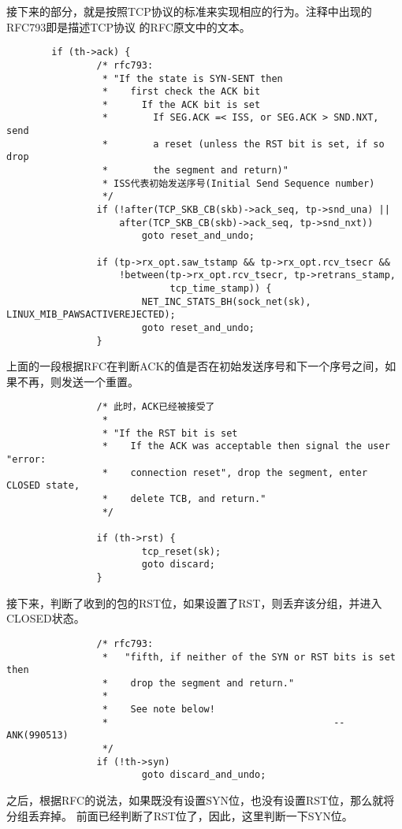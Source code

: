接下来的部分，就是按照TCP协议的标准来实现相应的行为。注释中出现的RFC793即是描述TCP协议
的RFC原文中的文本。
\begin{verbatim}
        if (th->ack) {
                /* rfc793:
                 * "If the state is SYN-SENT then
                 *    first check the ACK bit
                 *      If the ACK bit is set
                 *        If SEG.ACK =< ISS, or SEG.ACK > SND.NXT, send
                 *        a reset (unless the RST bit is set, if so drop
                 *        the segment and return)"
                 * ISS代表初始发送序号(Initial Send Sequence number)
                 */
                if (!after(TCP_SKB_CB(skb)->ack_seq, tp->snd_una) ||
                    after(TCP_SKB_CB(skb)->ack_seq, tp->snd_nxt))
                        goto reset_and_undo;

                if (tp->rx_opt.saw_tstamp && tp->rx_opt.rcv_tsecr &&
                    !between(tp->rx_opt.rcv_tsecr, tp->retrans_stamp,
                             tcp_time_stamp)) {
                        NET_INC_STATS_BH(sock_net(sk), LINUX_MIB_PAWSACTIVEREJECTED);
                        goto reset_and_undo;
                }
\end{verbatim}
上面的一段根据RFC在判断ACK的值是否在初始发送序号和下一个序号之间，如果不再，则发送一个重置。
\begin{verbatim}
                /* 此时，ACK已经被接受了
                 *
                 * "If the RST bit is set
                 *    If the ACK was acceptable then signal the user "error:
                 *    connection reset", drop the segment, enter CLOSED state,
                 *    delete TCB, and return."
                 */

                if (th->rst) {
                        tcp_reset(sk);
                        goto discard;
                }
\end{verbatim}
接下来，判断了收到的包的RST位，如果设置了RST，则丢弃该分组，并进入CLOSED状态。
\begin{verbatim}
                /* rfc793:
                 *   "fifth, if neither of the SYN or RST bits is set then
                 *    drop the segment and return."
                 *
                 *    See note below!
                 *                                        --ANK(990513)
                 */
                if (!th->syn)
                        goto discard_and_undo;
\end{verbatim}
之后，根据RFC的说法，如果既没有设置SYN位，也没有设置RST位，那么就将分组丢弃掉。
前面已经判断了RST位了，因此，这里判断一下SYN位。

